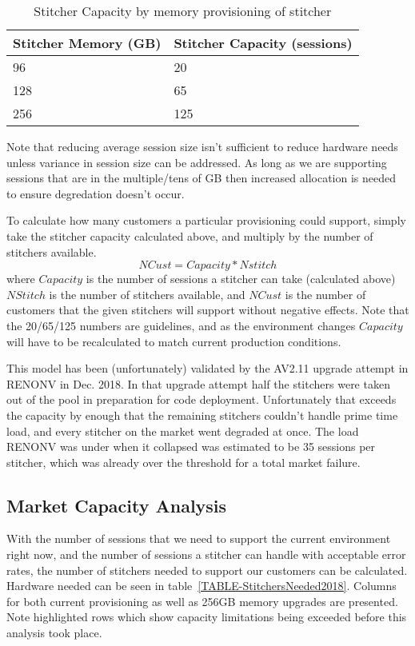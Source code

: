 \documentclass{article}
\begin{document}
\begin{table}[H]
\begin{tabular}{|l|l|} 
\hline Stitcher Memory (GB) & Stitcher Capacity (sessions) \\
\hline 96 & 20 \\
\hline 128 & 65 \\
\hline 256 & 125 \\
\hline 
\end{tabular}
\caption{\label{TABLE-StitcherCapacity}Stitcher Capacity by memory provisioning of stitcher}
\end{table}

Note that reducing average session size isn't sufficient to reduce hardware needs unless variance in session size can be addressed. As long as we are supporting sessions that are in the multiple/tens of GB then increased allocation is needed to ensure degredation doesn't occur. 

To calculate how many customers a particular provisioning could support, simply take the stitcher capacity calculated above, and multiply by the number of stitchers available. $$NCust=Capacity*Nstitch$$ where $Capacity$ is the number of sessions a stitcher can take (calculated above) $NStitch$ is the number of stitchers available, and $NCust$ is the number of customers that the given stitchers will support without negative effects. Note that the 20/65/125 numbers are guidelines, and as the environment changes $Capacity$ will have to be recalculated to match current production conditions. 

This model has been (unfortunately) validated by the AV2.11 upgrade attempt in RENONV in Dec. 2018. In that upgrade attempt half the stitchers were taken out of the pool in preparation for code deployment. Unfortunately that exceeds the capacity by enough that the remaining stitchers couldn't handle prime time load, and every stitcher on the market went degraded at once. The load RENONV was under when it collapsed was estimated to be 35 sessions per stitcher, which was already over the threshold for a total market failure. 

\subsection{Market Capacity Analysis}
\label{SECTION-MarketCapacity}

With the number of sessions that we need to support the current environment right now, and the number of sessions a stitcher can handle with acceptable error rates, the number of stitchers needed to support our customers can be calculated.  Hardware needed can be seen in table~\ref{TABLE-StitchersNeeded2018}. Columns for both current provisioning as well as 256GB memory upgrades are presented. Note highlighted rows which show capacity limitations being exceeded before this analysis took place. 
\end{document}
